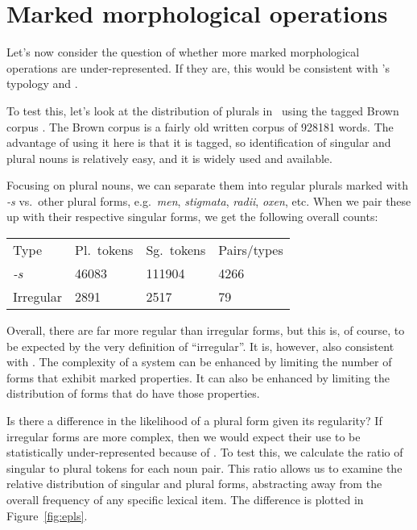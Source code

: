 \documentclass[output=paper,
modfonts
]{LSP/langsci}
\begin{document}
\section{Marked morphological operations}

Let's now consider the question of whether more marked morphological operations are under-represented. If they are, this would be consistent with \citeauthor{dimensions}'s typology and \io.

To test this, let's look at the distribution of plurals in \e\ using the tagged Brown corpus \citep{kf}. The Brown corpus is a fairly old written corpus of 928181 words. The advantage of using it here is that it is tagged, so identification of singular and plural nouns is relatively easy, and it is widely used and available.

Focusing on plural nouns, we can separate them into regular plurals marked with \emph{-s} vs.\ other plural forms, e.g.\ \emph{men}, \emph{stigmata}, \emph{radii}, \emph{oxen}, etc. When we pair these up with their respective singular forms, we get the following overall counts:

\ea
\begin{tabular}[t]{llll}
Type      & Pl.\ tokens & Sg.\ tokens & Pairs/types \\
\emph{-s} & 46083
          & 111904
          & 4266 \\
Irregular & 2891
          & 2517
          & 79 \\
\end{tabular}
\z

\noindent Overall, there are far more regular than irregular forms, but this is, of course, to be expected by the very definition of ``irregular''. It is, however, also consistent with \io. The complexity of a system can be enhanced by limiting the number of forms that exhibit marked properties. It can also be enhanced by limiting the distribution of forms that do have those properties.

Is there a difference in the likelihood of a plural form given its regularity? If irregular forms are more complex, then we would expect their use to be statistically under-represented because of \io. To test this, we calculate the ratio of singular to plural tokens for each noun pair. This ratio allows us to examine the relative distribution of singular and plural forms, abstracting away from the overall frequency of any specific lexical item. The difference is plotted in Figure~\ref{fig:epls}.
\end{document}
